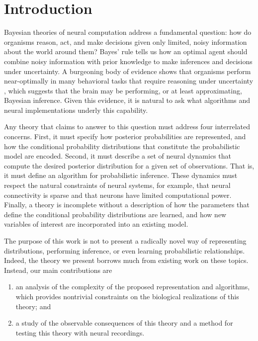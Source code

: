 \section{Introduction}
Bayesian theories of neural computation address a fundamental
question: how do organisms reason, act, and make decisions given only
limited, noisy information about the world around them?  Bayes' rule
tells us how an optimal agent should combine noisy information with
prior knowledge to make inferences and decisions under uncertainty. A
burgeoning body of evidence shows that organisms perform
near-optimally in many behavioral tasks that require reasoning under
uncertainty , which suggests that the brain may be performing, or at
least approximating, Bayesian inference.  Given this evidence, it is
natural to ask what algorithms and neural implementations underly this
capability. 

Any theory that claims to answer to this question must address four
interrelated concerns.  First, it must specify how posterior
probabilities are represented, and how the conditional probability
distributions that constitute the probabilistic model are encoded.
Second, it must describe a set of neural dynamics that compute the
desired posterior distribution for a given set of observations. That
is, it must define an algorithm for probabilistic inference. These
dynamics must respect the natural constraints of neural systems, for
example, that neural connectivity is sparse and that neurons have
limited computational power. Finally, a theory is incomplete without a
description of how the parameters that define the conditional
probability distributions are learned, and how new variables of
interest are incorporated into an existing model.


The purpose of this work is not to present a radically novel
  way of representing distributions, performing inference, or even
  learning probabilistic relationships. Indeed, the theory we present
  borrows much from existing work on these topics. Instead, our main contributions
  are
  \begin{enumerate}
    \item an analysis of the complexity of the proposed representation
  and algorithms, which provides nontrivial constraints on the
  biological realizations of this theory; 
  and \item a study of the observable consequences of this theory and
  a method for testing this theory with neural recordings. 
  \end{enumerate}


